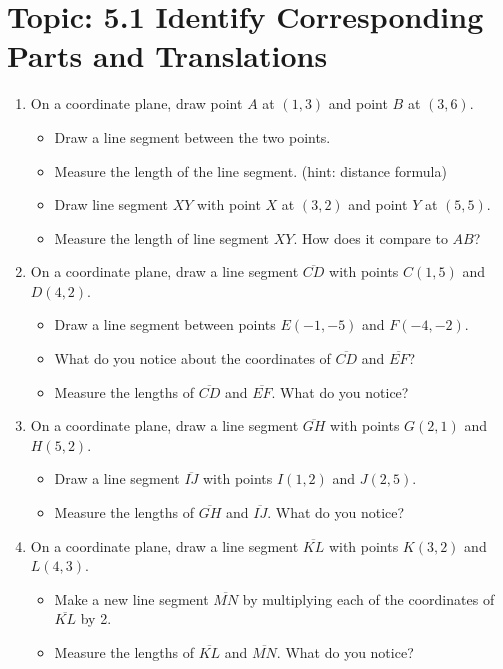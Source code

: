 \documentclass[12pt,letterpaper]{article}
\begin{document}
\section*{Topic: 5.1 Identify Corresponding Parts and Translations}
\begin{enumerate}
\item On a coordinate plane, draw point $A$ at $(1, 3)$ and point $B$ at $(3, 6)$.
\begin{itemize}
    \item Draw a line segment between the two points.
    \item Measure the length of the line segment. (hint: distance formula)
    \item Draw line segment $XY$ with point $X$ at $(3, 2)$ and point $Y$ at $(5, 5)$.
    \item Measure the length of line segment $XY$. How does it compare to $AB$?
\end{itemize}
\item On a coordinate plane, draw a line segment $\overline{CD}$ with points $C(1, 5)$ and $D(4, 2)$.
\begin{itemize}
\item Draw a line segment between points $E(-1, -5)$ and $F(-4, -2)$.
\item What do you notice about the coordinates of $\overline{CD}$ and $\overline{EF}$?
\item Measure the lengths of $\overline{CD}$ and $\overline{EF}$. What do you notice?
\end {itemize}
\item On a coordinate plane, draw a line segment $\overline{GH}$ with points $G(2, 1)$ and $H(5, 2)$.
\begin{itemize}
    \item Draw a line segment $\overline{IJ}$ with points $I(1, 2)$ and $J(2, 5)$.
    \item Measure the lengths of $\overline{GH}$ and $\overline{IJ}$. What do you notice?
\end{itemize}
\item On a coordinate plane, draw a line segment $\overline{KL}$ with points $K(3, 2)$ and $L(4, 3)$.
\begin{itemize}
    \item Make a new line segment $\overline{MN}$ by multiplying each of the coordinates of $\overline{KL}$ by 2.
    \item Measure the lengths of $\overline{KL}$ and $\overline{MN}$. What do you notice?
\end{itemize}
\end{enumerate}
\end{document}
